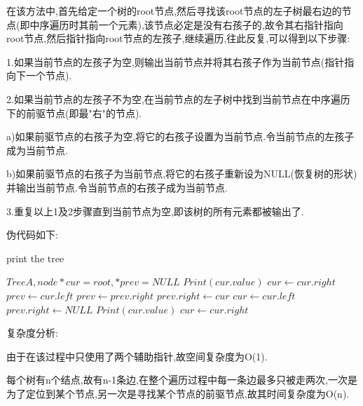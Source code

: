 \documentclass[12pt,a4paper,fontset=none]{ctexart}
\begin{document}
在该方法中,首先给定一个树的root节点,然后寻找该root节点的左子树最右边的节点(即中序遍历时其前一个元素),该节点必定是没有右孩子的,故令其右指针指向root节点,然后指针指向root节点的左孩子,继续遍历,往此反复,可以得到以下步骤:

1.如果当前节点的左孩子为空,则输出当前节点并将其右孩子作为当前节点(指针指向下一个节点).

2.如果当前节点的左孩子不为空,在当前节点的左子树中找到当前节点在中序遍历下的前驱节点(即最"右"的节点).

a)如果前驱节点的右孩子为空,将它的右孩子设置为当前节点.令当前节点的左孩子成为当前节点.

b)如果前驱节点的右孩子为当前节点,将它的右孩子重新设为NULL(恢复树的形状)并输出当前节点.令当前节点的右孩子成为当前节点.

3.重复以上1及2步骤直到当前节点为空,即该树的所有元素都被输出了.

伪代码如下:
\begin{algorithm}
	\caption{print the tree}
	\label{alg2}
	\begin{algorithmic}
		\Require  $Tree A,node *cur=root,*prev=NULL$
		\State $Print(cur.value)$
		\State $cur\gets cur.right$
		\Else
		\State $prev\gets cur.left$
		\State $prev\gets prev.right$
		\EndWhile
		\State $prev.right\gets cur$
		\State $cur\gets cur.left$
		\Else {}
		\State $prev.right\gets NULL$
		\State $Print(cur.value)$
		\State $cur\gets cur.right$
		\EndIf
		\EndIf
		\EndWhile
	\end{algorithmic}
\end{algorithm}
复杂度分析:

由于在该过程中只使用了两个辅助指针,故空间复杂度为O(1).

每个树有n个结点,故有n-1条边,在整个遍历过程中每一条边最多只被走两次,一次是为了定位到某个节点,另一次是寻找某个节点的前驱节点,故其时间复杂度为O(n).
\end{document}
